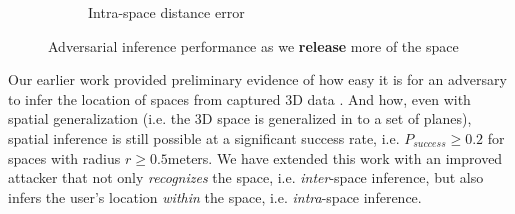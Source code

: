\begin{figure}[t]
\begin{subfigure}{0.37\columnwidth}
		\vspace{-5mm}
        \caption{\footnotesize Intra-space distance error}
		\label{fig:successive-intraspace}
	\end{subfigure}
	\vspace{-3mm}
    \caption{\small Adversarial inference performance as we \textbf{release} more of the space}
	\label{fig:successive-performance}
	\vspace{-5mm}
\end{figure}

Our earlier work provided preliminary evidence of how easy it is for an adversary to infer the location of spaces from captured 3D data \cite{deguzman2019firstlook}. And how, even with spatial generalization (i.e. the 3D space is generalized in to a set of planes), spatial inference is still possible at a significant success rate, i.e. $P_{success}\geq0.2$ for spaces with radius $r\geq 0.5$meters. We have extended this work with an improved attacker that not only \textit{recognizes} the space, i.e. \textit{inter}-space inference, but also infers the user's location \textit{within} the space, i.e. \textit{intra}-space inference. %


